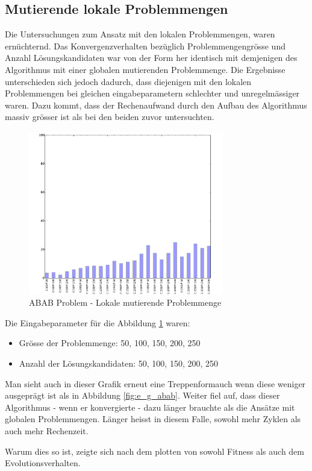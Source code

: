 \subsection{Mutierende lokale Problemmengen}
Die Untersuchungen zum Ansatz mit den lokalen Problemmengen, waren ernüchternd. Das Konvergenzverhalten bezüglich Problemmengengrösse und Anzahl Lösungskandidaten war von der Form her identisch mit demjenigen des Algorithmus mit einer globalen mutierenden Problemmenge. Die Ergebnisse unterschieden sich jedoch dadurch, dass diejenigen mit den lokalen Problemmengen bei gleichen eingabeparametern schlechter und unregelmässiger waren. Dazu kommt, dass der Rechenaufwand durch den Aufbau des Algorithmus massiv grösser ist als bei den beiden zuvor untersuchten.

\begin{figure}[H]
  \centering
  \includegraphics[width=0.76\textwidth]{images/E_L_abab_solved.pdf}
  \caption[ABAB Problem - Lokale mutierende Problemmenge]{ABAB Problem - Lokale mutierende Problemmenge}
  \label{fig:e_l_abab}
\end{figure}

Die Eingabeparameter für die Abbildung \ref{fig:e_l_abab} waren:
\begin{itemize}
	\item Grösse der Problemmenge: 50, 100, 150, 200, 250
	\item Anzahl der Lösungskandidaten: 50, 100, 150, 200, 250
\end{itemize}

Man sieht auch in dieser Grafik erneut eine \flqq Treppenform\frqq auch wenn diese weniger ausgeprägt ist als in Abbildung \ref{fig:e_g_abab}. Weiter fiel auf, dass dieser Algorithmus - wenn er konvergierte - dazu länger brauchte als die Ansätze mit globalen Problemmengen. Länger heisst in diesem Falle, sowohl mehr Zyklen als auch mehr Rechenzeit.

Warum dies so ist, zeigte sich nach dem plotten von sowohl Fitness als auch dem Evolutionsverhalten.
